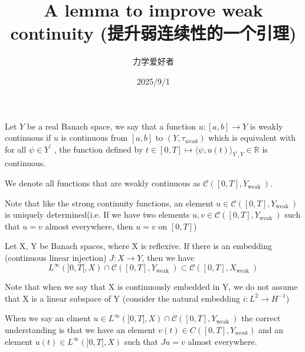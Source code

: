 \documentclass{beamer}
\title{A lemma to improve weak continuity
(提升弱连续性的一个引理)}
\author{力学爱好者}
\institute{XJTU}
\date{2025/9/1}
\begin{document}
\begin{frame}
  \titlepage
\end{frame}





\begin{frame}

\begin{definition}
    Let $Y$ be a real Banach space, we say that a function $u:[a, b] \rightarrow Y$
    is weakly continuous if $u$ is continuous from  $[a, b]$ to $(Y, \tau_{weak})$ which is equivalent 
    with for all  $\psi \in Y^{\prime}$ , the function defined by  $t \in[0, T] \mapsto \langle\psi, u(t)\rangle_{Y^{\prime}, Y} \in \mathbb{R}$  is continuous.
    
    We denote all functions that are weakly continuous as $\mathcal{C}\left([0, T], Y_{\text {weak }}\right)$.
\end{definition}



 Note that like the strong continuity functions, an element $u \in \mathcal{C}\left([0, T], Y_{\text {weak }}\right)$
    is uniquely determined(i.e. If we have two elements $u, v \in \mathcal{C}\left([0, T], Y_{\text {weak }}\right)$ such that $u=v$
    almost everywhere, then $u=v$ on $[0, T]$)
    


    \begin{lemma}
        Let X, Y be Banach spaces, where X is reflexive. If there is an embedding (continuous linear injection)
        $J:X\rightarrow Y$, 
        then we have
        \begin{equation*}
            L^{\infty}(]0,T[,X) \cap \mathcal{C}\left([0, T], Y_{\text {weak }}\right)
       \subset     
\mathcal{C}\left([0, T], X_{\text {weak }}\right)
        \end{equation*}
    \end{lemma}



\end{frame}

\begin{frame}
    
 Note that when we say that X is continuously embedded in Y, we do not assume that X is a linear
 subspace of Y (consider the natural embedding $i:L^2 \rightarrow H^{-1}$)

When we say an elment $u\in  L^{\infty}(]0,T[,X) \cap \mathcal{C}\left([0, T], Y_{\text {weak }}\right)$
the correct understanding is that we have an element $v(t) \in C([0,T],Y_{weak})$ and an element $u(t)\in L^{\infty}(]0,T[,X)$
such that $Ju=v$ almost everywhere.


 

\end{frame}
\end{document}
